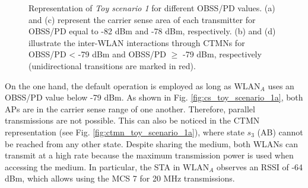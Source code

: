 \documentclass[preprint,12pt]{elsarticle}
\begin{document}
\begin{figure}[h!]
{{}}
		\caption{Representation of \emph{Toy scenario 1 }for different OBSS/PD values. (a) and (c) represent the carrier sense area of each transmitter for OBSS/PD equal to -82 dBm and -78 dBm, respectively. (b) and (d) illustrate the inter-WLAN interactions through CTMNs for OBSS/PD < -79 dBm and OBSS/PD $\geq$ -79 dBm, respectively (unidirectional transitions are marked in red).}
		\label{fig:toy_scenario_1b}
	\end{figure}
	
	On the one hand, the default operation is employed as long as $\text{WLAN}_A$ uses an OBSS/PD value below -79 dBm. As shown in Fig. \ref{fig:cs_toy_scenario_1a}, both APs are in the carrier sense range of one another. Therefore, parallel transmissions are not possible. This can also be noticed in the CTMN representation (see Fig. \ref{fig:ctmn_toy_scenario_1a}), where state $s_3$ (AB) cannot be reached from any other state. Despite sharing the medium, both WLANs can transmit at a high rate because the maximum transmission power is used when accessing the medium. In particular, the STA in $\text{WLAN}_A$ observes an RSSI of -64 dBm, which allows using the MCS 7 for 20 MHz transmissions.
	
\end{document}
